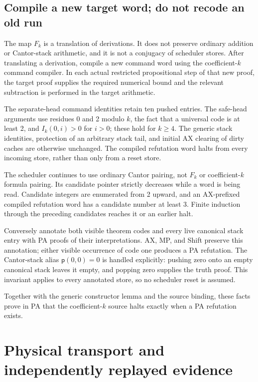 \documentclass[10pt,letterpaper]{article}
\newcommand{\pair}{\mathsf p}
\begin{document}
\subsection{Compile a new target word; do not recode an old run}

The map $F_k$ is a translation of derivations. It does not preserve ordinary addition or Cantor-stack arithmetic, and it is not a conjugacy of scheduler stores. After translating a derivation, compile a new command word using the coefficient-$k$ command compiler. In each actual restricted propositional step of that new proof, the target proof supplies the required numerical bound and the relevant subtraction is performed in the target arithmetic.

The separate-head command identities retain ten pushed entries. The safe-head arguments use residues 0 and 2 modulo $k$, the fact that a universal code is at least 2, and $I_k(0,i)>0$ for $i>0$; these hold for $k\ge4$. The generic stack identities, protection of an arbitrary stack tail, and initial AX clearing of dirty caches are otherwise unchanged. The compiled refutation word halts from every incoming store, rather than only from a reset store.

The scheduler continues to use ordinary Cantor pairing, not $F_k$ or coefficient-$k$ formula pairing. Its candidate pointer strictly decreases while a word is being read. Candidate integers are enumerated from 2 upward, and an AX-prefixed compiled refutation word has a candidate number at least 3. Finite induction through the preceding candidates reaches it or an earlier halt.

Conversely annotate both visible theorem codes and every live canonical stack entry with PA proofs of their interpretations. AX, MP, and Shift preserve this annotation; either visible occurrence of code one produces a PA refutation. The Cantor-stack alias $\pair(0,0)=0$ is handled explicitly: pushing zero onto an empty canonical stack leaves it empty, and popping zero supplies the truth proof. This invariant applies to every annotated store, so no scheduler reset is assumed.

Together with the generic constructor lemma and the source binding, these facts prove in PA that the coefficient-$k$ source halts exactly when a PA refutation exists.

\section{Physical transport and independently replayed evidence}
\end{document}
